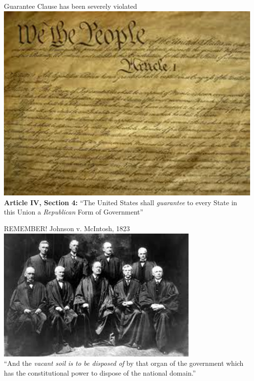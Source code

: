 \begin{frame}{Guarantee Clause has been severely violated}
    \centering
    \includegraphics[height=.7\textheight]{img/constitution.png} \\
    \textbf{Article IV, Section 4:} ``The United States shall \emph{guarantee} to every State in this Union a \emph{Republican} Form of Government''
\end{frame}

\begin{frame}{REMEMBER! Johnson v. McIntosh, 1823}
    \centering
    \includegraphics[width=0.75\textwidth]{img/sc-1905.png} \\
    ``And the \emph{vacant soil is to be disposed of} by that organ of the government which has the constitutional power to dispose of the national domain.'' \\
\end{frame}

